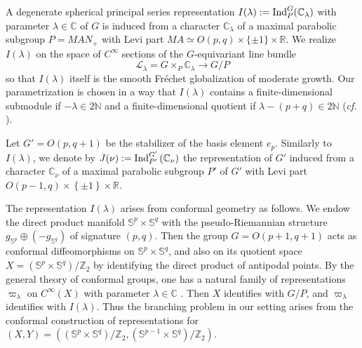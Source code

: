 \documentclass[reqno,12pt]{pja00} %
\providecommand{\C}{\mathbb{C}}
\newcommand{\Z}{\mathbb{Z}}
\newcommand{\R}{\mathbb{R}}
\newcommand{\N}{\mathbb{N}}
\newcommand{\Sp}{\mathbb{S}}
\theoremstyle{plain}
\newcommand{\Ind}{\mbox{\normalfont Ind}}
\theoremstyle{definition}
\theoremstyle{exampstyle} \newtheorem{examp}[theorem]{Theorem}
\begin{document}
A degenerate spherical principal series representation $I(\lambda):=\Ind_P^G(\C_{\lambda})$ with parameter $\lambda\in\C$ of $G$ is induced from
a character $\C_\lambda$ of a maximal parabolic subgroup $P=MAN_+$
with Levi part
$M A \simeq O (p, q) \times \{ \pm 1 \} \times \mathbb{R}$.
We realize $I(\lambda)$ on the space of $C^\infty$ sections
of the $G$-equivariant line bundle\[
	\mathcal{L}_\lambda=G\times_{P}\C_\lambda\to G/P
\]
so that $I(\lambda)$ itself is the smooth Fr\'echet globalization of moderate growth.
Our parametrization is chosen in a way that
$I(\lambda)$ contains a finite-dimensional submodule if $-\lambda\in2\N$ and a finite-dimensional quotient if $\lambda-\left( p+q\right)\in2\N$ ({\it cf.} \cite{howe1993homogeneous}).

Let $G'=O(p,q+1)$ be the stabilizer of the basis element $e_p$. Similarly to $I(\lambda)$,
we denote by $J(\nu):=\Ind_{P'}^{G'}\left( \C_\nu \right)$ the representation of $G'$
induced from a character $\C_\nu$ of a
maximal parabolic
subgroup $P'$ of $G'$ with Levi part $O(p-1,q)\times\left\{ \pm1 \right\}\times\R$.

The representation $I (\lambda)$ arises from conformal
geometry as follows. We endow the direct product manifold $\Sp^p\times\Sp^q$ with the pseudo-Riemannian structure $g_{\Sp^p}\oplus\left( -g_{\Sp^q} \right)$ of signature $(p,q)$.
Then the group $G=O(p+1,q+1)$ acts as conformal diffeomorphisms on $\Sp^p\times\Sp^q$, and also on its quotient space $X=\left( \Sp^p\times\Sp^q \right)/\Z_2$
by identifying
the direct product of
antipodal points. By
the general theory of conformal {groups}, one has a natural family of representations $\varpi_\lambda$ on $C^\infty(X)$
with parameter $\lambda\in\C$ \cite[Sect.\ 2]{KO1}. Then $X$ identifies with $G/P$, and $\varpi_\lambda$ identifies with $I(\lambda)$. Thus the
branching problem in our setting arises from the
conformal construction of representations for $(X,Y)=\left( \left(\Sp^p\times\Sp^q  \right)/\Z_2,\left( \Sp^{p-1}\times\Sp^q \right)/\Z_2 \right)$.
\end{document}
